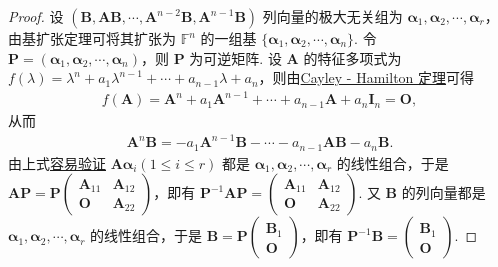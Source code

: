 \documentclass[../../main.tex]{subfiles}%
\begin{document}
\begin{proof}
设 $(\boldsymbol{B},\boldsymbol{A}\boldsymbol{B},\cdots,\boldsymbol{A}^{n - 2}\boldsymbol{B},\boldsymbol{A}^{n - 1}\boldsymbol{B})$ 列向量的极大无关组为 $\boldsymbol{\alpha}_1,\boldsymbol{\alpha}_2,\cdots,\boldsymbol{\alpha}_r$，由基扩张定理可将其扩张为 $\mathbb{F}^n$ 的一组基 $\{\boldsymbol{\alpha}_1,\boldsymbol{\alpha}_2,\cdots,\boldsymbol{\alpha}_n\}$. 令 $\boldsymbol{P}=(\boldsymbol{\alpha}_1,\boldsymbol{\alpha}_2,\cdots,\boldsymbol{\alpha}_n)$，则 $\boldsymbol{P}$ 为可逆矩阵. 设 $\boldsymbol{A}$ 的特征多项式为 $f(\lambda)=\lambda^n + a_1\lambda^{n - 1}+\cdots + a_{n - 1}\lambda + a_n$，则由\hyperref[theorem:Cayley-Hamilton定理]{Cayley - Hamilton 定理}可得
\begin{align*}
f(\boldsymbol{A})=\boldsymbol{A}^n + a_1\boldsymbol{A}^{n - 1}+\cdots + a_{n - 1}\boldsymbol{A}+a_n\boldsymbol{I}_n=\boldsymbol{O},
\end{align*}
从而
\begin{align}\label{equation12312434-1.1}
\boldsymbol{A}^n\boldsymbol{B}=-a_1\boldsymbol{A}^{n - 1}\boldsymbol{B}-\cdots - a_{n - 1}\boldsymbol{A}\boldsymbol{B}-a_n\boldsymbol{B}.    
\end{align}
由上式\hyperlink{例题0.7容易验证的原因}{容易验证} $\boldsymbol{A}\boldsymbol{\alpha}_i(1\leqslant  i\leqslant  r)$ 都是 $\boldsymbol{\alpha}_1,\boldsymbol{\alpha}_2,\cdots,\boldsymbol{\alpha}_r$ 的线性组合，于是 $\boldsymbol{A}\boldsymbol{P}=\boldsymbol{P}\begin{pmatrix}
\boldsymbol{A}_{11} & \boldsymbol{A}_{12} \\
\boldsymbol{O} & \boldsymbol{A}_{22}
\end{pmatrix}$，即有 $\boldsymbol{P}^{-1}\boldsymbol{A}\boldsymbol{P}=\begin{pmatrix}
\boldsymbol{A}_{11} & \boldsymbol{A}_{12} \\
\boldsymbol{O} & \boldsymbol{A}_{22}
\end{pmatrix}$. 又 $\boldsymbol{B}$ 的列向量都是 $\boldsymbol{\alpha}_1,\boldsymbol{\alpha}_2,\cdots,\boldsymbol{\alpha}_r$ 的线性组合，于是 $\boldsymbol{B}=\boldsymbol{P}\begin{pmatrix}
\boldsymbol{B}_1 \\
\boldsymbol{O}
\end{pmatrix}$，即有 $\boldsymbol{P}^{-1}\boldsymbol{B}=\begin{pmatrix}
\boldsymbol{B}_1 \\
\boldsymbol{O}
\end{pmatrix}$.
\end{proof}
\end{document}
